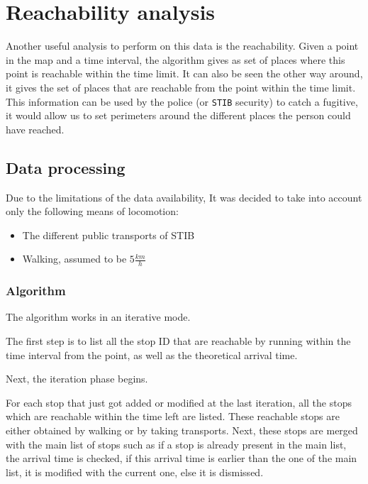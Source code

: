 \documentclass{article}
\begin{document}
\section{Reachability analysis}
Another useful analysis to perform on this data is the reachability. Given a point in the map and a time interval, the algorithm gives as set of places where this point is reachable within the time limit. It can also be seen the other way around, it gives the set of places that are reachable from the point within the time limit. This information can be used by the police (or \texttt{STIB} security) to catch a fugitive, it would allow us to set perimeters around the different places the person could have reached.

\subsection{Data processing}
Due to the limitations of the data availability, It was decided to take into account only the following means of locomotion:

\begin{itemize}
    \item The different public transports of STIB
    \item Walking, assumed to be $5 \frac{km}{h}$
\end{itemize}

\subsubsection{Algorithm}

The algorithm works in an iterative mode.

The first step is to list all the stop ID that are reachable by running within the time interval from the point, as well as the theoretical arrival time.

Next, the iteration phase begins.

For each stop that just got added or modified at the last iteration, all the stops which are reachable within the time left are listed. These reachable stops are either obtained by walking or by taking transports. Next, these stops are merged with the main list of stops such as if a stop is already present in the main list, the arrival time is checked, if this arrival time is earlier than the one of the main list, it is modified with the current one, else it is dismissed.
\end{document}
